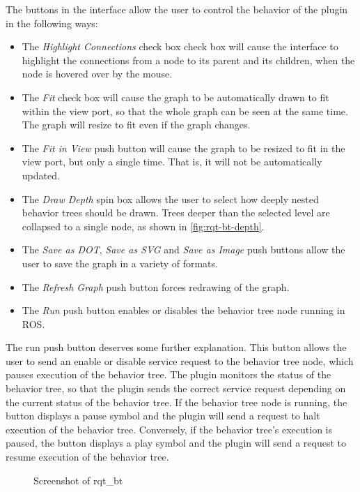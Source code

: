 \documentclass[\rootfolder/main.tex]{subfiles}
\begin{document}
The buttons in the interface allow the user to control the behavior of the plugin in the following ways:

\begin{itemize}
\item The \emph{Highlight Connections} check box check box will cause the interface to highlight the connections from a node to its parent and its children, when the node is hovered over by the mouse.
\item The \emph{Fit} check box will cause the graph to be automatically drawn to fit within the view port, so that the whole graph can be seen at the same time. The graph will resize to fit even if the graph changes.
\item The \emph{Fit in View} push button will cause the graph to be resized to fit in the view port, but only a single time. That is, it will not be automatically updated.
\item The \emph{Draw Depth} spin box allows the user to select how deeply nested behavior trees should be drawn. Trees deeper than the selected level are collapsed to a single node, as shown in \cref{fig:rqt-bt-depth}.
\item The \emph{Save as DOT}, \emph{Save as SVG} and \emph{Save as Image} push buttons allow the user to save the graph in a variety of formats.
\item The \emph{Refresh Graph} push button forces redrawing of the graph.
\item The \emph{Run} push button enables or disables the behavior tree node running in ROS.
\end{itemize}

The run push button deserves some further explanation.
This button allows the user to send an enable or disable service request to the behavior tree node, which pauses execution of the behavior tree.
The plugin monitors the status of the behavior tree, so that the plugin sends the correct service request depending on the current status of the behavior tree.
If the behavior tree node is running, the button displays a pause symbol and the plugin will send a request to halt execution of the behavior tree.
Conversely, if the behavior tree's execution is paused, the button displays a play symbol and the plugin will send a request to resume execution of the behavior tree.

\begin{figure}[ht]
    \caption{Screenshot of rqt\_bt}
    \label{fig:rqt-bt}
\end{figure}
\end{document}
